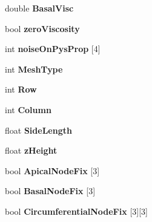 \begin{DoxyCompactItemize}
\item 
\hypertarget{classSimulation_a39c152c1f7e8700871e9700e1e73978e}{}double {\bfseries Basal\+Visc}\label{classSimulation_a39c152c1f7e8700871e9700e1e73978e}

\item 
\hypertarget{classSimulation_a439e2fbf9ee847f88fffd030acf4843c}{}bool {\bfseries zero\+Viscosity}\label{classSimulation_a439e2fbf9ee847f88fffd030acf4843c}

\item 
\hypertarget{classSimulation_a5e1b2288bbab80084380420e00a1f371}{}int {\bfseries noise\+On\+Pys\+Prop} \mbox{[}4\mbox{]}\label{classSimulation_a5e1b2288bbab80084380420e00a1f371}

\item 
\hypertarget{classSimulation_a3dc59b7f2368423781a41b0a457af1e4}{}int {\bfseries Mesh\+Type}\label{classSimulation_a3dc59b7f2368423781a41b0a457af1e4}

\item 
\hypertarget{classSimulation_a7e232e744b0c21c7d878dc454e74b898}{}int {\bfseries Row}\label{classSimulation_a7e232e744b0c21c7d878dc454e74b898}

\item 
\hypertarget{classSimulation_ad700818601343ea02758de553eaab8e3}{}int {\bfseries Column}\label{classSimulation_ad700818601343ea02758de553eaab8e3}

\item 
\hypertarget{classSimulation_a8f79cab9b0ff8dc3802e1bf1f903d1c7}{}float {\bfseries Side\+Length}\label{classSimulation_a8f79cab9b0ff8dc3802e1bf1f903d1c7}

\item 
\hypertarget{classSimulation_a27aa62c2297902e2e77159fe05362467}{}float {\bfseries z\+Height}\label{classSimulation_a27aa62c2297902e2e77159fe05362467}

\item 
\hypertarget{classSimulation_a34b767055f674bf25b1b000c60683447}{}bool {\bfseries Apical\+Node\+Fix} \mbox{[}3\mbox{]}\label{classSimulation_a34b767055f674bf25b1b000c60683447}

\item 
\hypertarget{classSimulation_a1d716c8688103f42b89242d962c9ab1b}{}bool {\bfseries Basal\+Node\+Fix} \mbox{[}3\mbox{]}\label{classSimulation_a1d716c8688103f42b89242d962c9ab1b}

\item 
\hypertarget{classSimulation_acc1062ac8c49668972bcce3fb4b333b8}{}bool {\bfseries Circumferential\+Node\+Fix} \mbox{[}3\mbox{]}\mbox{[}3\mbox{]}\label{classSimulation_acc1062ac8c49668972bcce3fb4b333b8}


\end{DoxyCompactItemize}
